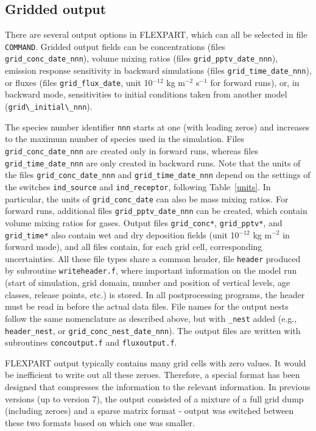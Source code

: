 \documentclass{egu}                  %
\begin{document}
\subsection{Gridded output}

There are several output options in FLEXPART, which can all be selected in file
\verb|COMMAND|.  Gridded output fields can be concentrations (files
\verb|grid_conc_date_nnn|), volume mixing ratios (files
\verb|grid_pptv_date_nnn|), emission response sensitivity in backward
simulations (files \verb|grid_time_date_nnn|), or fluxes (files
\verb|grid_flux_date|, unit 10$^{-12}$ kg m$^{-2}$ s$^{-1}$ for forward runs),
or, in backward mode, sensitivities to initial conditions taken from another
model (\verb|grid\_initial\_nnn|).

The species number identifier \verb|nnn| starts at one (with leading zeros) and
increases to the maximum number of species used in the simulation.  Files
\verb|grid_conc_date_nnn| are created only in forward runs, whereas files
\verb|grid_time_date_nnn| are only created in backward runs.  Note that the
units of the files \verb|grid_conc_date_nnn| and \verb|grid_time_date_nnn|
depend on the settings of the switches \verb|ind_source| and
\verb|ind_receptor|, following Table~\ref{units}.  In particular, the units of
\verb|grid_conc_date| can also be mass mixing ratios.  For forward runs,
additional files \verb|grid_pptv_date_nnn| can be created, which contain volume
mixing ratios for gases.  Output files \verb|grid_conc*|, \verb|grid_pptv*|,
and \verb|grid_time*| also contain wet and dry deposition fields (unit
10$^{-12}$ kg m$^{-2}$ in forward mode), and all files contain, for each grid
cell, corresponding uncertainties.  All these file types share a common header,
file \verb|header| produced by subroutine \verb|writeheader.f|, where important
information on the model run (start of simulation, grid domain, number and
position of vertical levels, age classes, release points, etc.) is stored.  In
all postprocessing programs, the header must be read in before the actual data
files.  File names for the output nests follow the same nomenclature as
described above, but with \verb|_nest| added (e.g., \verb|header_nest|, or
\verb|grid_conc_nest_date_nnn|).  The output files are written with subroutines
\verb|concoutput.f| and \verb|fluxoutput.f|.

FLEXPART output typically contains many grid cells with zero values.  It would
be inefficient to write out all these zeroes.  Therefore, a special format has
been designed that compresses the information to the relevant information.  In
previous versions (up to version 7), the output consisted of a mixture of a
full grid dump (including zeroes) and a sparse matrix format - output was
switched between these two formats based on which one was smaller.
\end{document}
